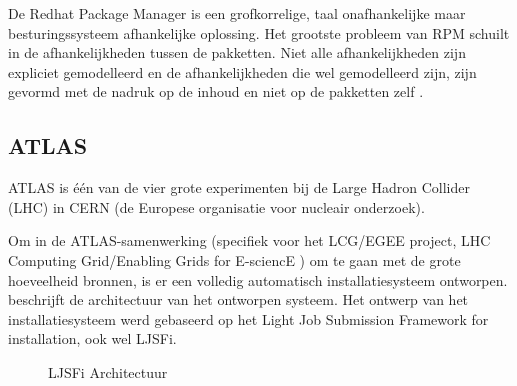 De Redhat Package Manager is een grofkorrelige, taal onafhankelijke maar besturingssysteem afhankelijke oplossing.
Het grootste probleem van RPM schuilt in de afhankelijkheden tussen de pakketten.
Niet alle afhankelijkheden zijn expliciet gemodelleerd en de afhankelijkheden die wel gemodelleerd zijn, zijn gevormd met de nadruk op de inhoud en niet op de pakketten zelf \citep{softwareDeployment}.  

\subsection{ATLAS}\label{sec:ATLAS}
ATLAS is één van de vier grote experimenten bij de Large Hadron Collider (LHC) in CERN (de Europese organisatie voor nucleair onderzoek).

Om in de ATLAS-samenwerking (specifiek voor het LCG/EGEE project, LHC Computing Grid/Enabling Grids for E-sciencE \citep{bird2005lhc}) om te gaan met de grote hoeveelheid bronnen, is er een volledig automatisch installatiesysteem ontworpen. 
\citet{salvo2008atlas} beschrijft de architectuur van het ontworpen systeem.
Het ontwerp van het installatiesysteem werd gebaseerd op het Light Job Submission Framework for installation, ook wel LJSFi.

\begin{figure}[!ht]
\centering
{}
\caption{LJSFi Architectuur \citep{salvo2008atlas}}
\label{fig:ljsfiArchi}
\end{figure}


